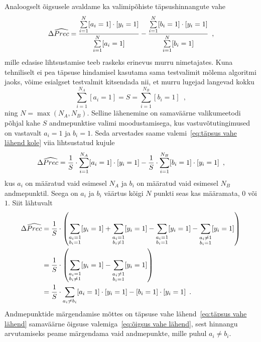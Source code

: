 Analoogselt õigsusele avaldame ka valimipõhiste täpsushinnangute vahe
\begin{equation}
    \label{eq:täpsus vahe lähend kole}
    \Delta \widehat{Prec} = \frac{\sum \limits_{i = 1}^{N} [a_i = 1] \cdot [y_i = 1]}{\sum \limits_{i = 1}^N [a_i = 1]} - 
    \frac{\sum \limits_{i = 1}^{N} [b_i = 1] \cdot [y_i = 1]}{\sum \limits_{i = 1}^N [b_i = 1]} \enspace,
\end{equation}
mille edasise lihtsustamise teeb raskeks erinevus murru nimetajates. Kuna tehniliselt ei pea täpsuse hindamisel kasutama sama testvalimit mõlema algoritmi jaoks, võime esialgset testvalmit kitsendada nii, et murru lugejad langevad kokku
\begin{equation*}
    \sum_{i = 1}^{N_A} [a_i = 1] = S = \sum_{i = 1}^{N_B} [b_i = 1] \enspace,
\end{equation*}
ning $N = \max (N_A, N_B)$.
Selline lähenemine on samaväärne valikumeetodi põhjal kahe $S$ andmepunktise valimi moodustamisega, kus vastuvõtutingimused on vastavalt $a_i = 1$ ja $b_i = 1$. Seda arvestades saame valemi~\eqref{eq:täpsus vahe lähend kole} viia lihtsustatud kujule
\begin{equation*}
     \Delta \widehat{Prec} = \frac{1}{S} \cdot \sum_{i = 1}^{N_A} [a_i = 1] \cdot [y_i = 1] - \frac{1}{S} \cdot \sum_{i = 1}^{N_B} [b_i = 1] \cdot [y_i = 1] \enspace,
\end{equation*}
kus $a_i$ on määratud vaid esimesel $N_A$ ja $b_i$ on määratud vaid esimesel $N_B$ andmepunktil. Seega on $a_i$ ja $b_i$ väärtus kõigi $N$ punkti seas kas määramata, $0$ või $1$. Siit lähtuvalt
\begin{align}
    \Delta \widehat{Prec} &= \frac{1}{S} \cdot \left( \sum_{\substack{a_i = 1 \\ b_i = 1}} [y_i = 1] + \sum_{\substack{a_i = 1 \\ b_i \neq 1}} [y_i = 1] - \sum_{\substack{a_i = 1 \\ b_i = 1}} [y_i = 1] - \sum_{\substack{a_i \neq 1 \\ b_i = 1}} [y_i = 1] \right) \nonumber\\
    &= \frac{1}{S} \cdot \left( \sum_{\substack{a_i = 1 \\ b_i \neq 1}} [y_i = 1] - \sum_{\substack{a_i \neq 1 \\ b_i = 1}}[y_i = 1] \right) \nonumber\\
    &= \frac{1}{S} \cdot \sum_{a_i \neq b_i} [a_i = 1] \cdot [y_i = 1] - [b_i = 1] \cdot [y_i = 1] \enspace. \label{eq:täpsus vahe lähend}
\end{align}
Andmepunktide märgendamise mõttes on täpsuse vahe lähend~\eqref{eq:täpsus vahe lähend} samaväärne õigsuse valemiga~\eqref{eq:õigsus vahe lähend}, sest hinnangu arvutamiseks peame märgendama vaid andmepunkte, mille puhul $a_i\neq b_i$.

